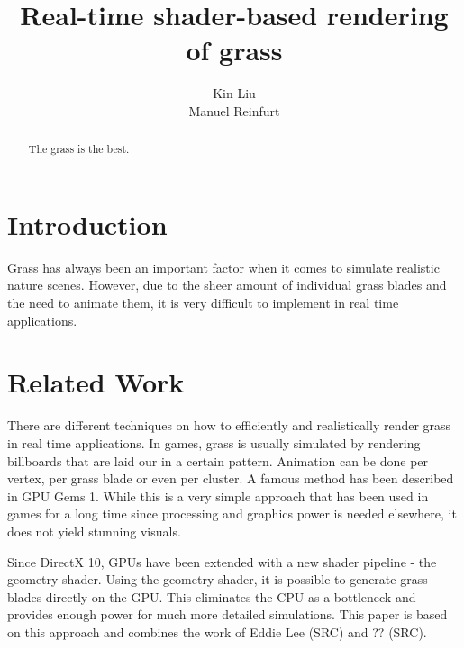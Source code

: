 \documentclass[conference]{acmsiggraph}
\title{Real-time shader-based rendering of grass}
\author {Kin Liu\\Manuel Reinfurt}
\begin{document}

\maketitle

\begin{abstract}

The grass is the best.

\end{abstract}

\TOGlinkslist


\copyrightspace

\section{Introduction}

Grass has always been an important factor when it comes to simulate realistic nature scenes. However, due to the sheer amount of individual grass blades and the need to animate them, it is very difficult to implement in real time applications. 


\section{Related Work}

There are different techniques on how to efficiently and realistically render grass in real time applications. In games, grass is usually simulated by rendering billboards that are laid our in a certain pattern. Animation can be done per vertex, per grass blade or even per cluster. A famous method has been described in GPU Gems 1. While this is a very simple approach that has been used in games for a long time since processing and graphics power is needed elsewhere, it does not yield stunning visuals.

Since DirectX 10, GPUs have been extended with a new shader pipeline - the geometry shader. Using the geometry shader, it is possible to generate grass blades directly on the GPU. This eliminates the CPU as a bottleneck and provides enough power for much more detailed simulations. This paper is based on this approach and combines the work of Eddie Lee (SRC) and ?? (SRC).
\end{document}
